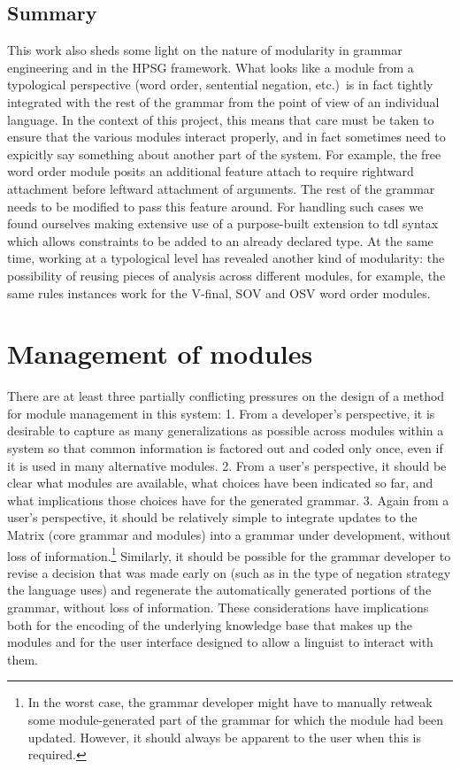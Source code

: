 \documentclass[11pt]{article}
\begin{document}
\subsection{Summary}

This work also sheds some light on the nature of modularity in grammar
engineering and in the HPSG framework.  What looks like a module from
a typological perspective (word order, sentential negation, etc.)\ is
in fact tightly integrated with the rest of the grammar from the point
of view of an individual language.  In the context of this project,
this means that care must be taken to ensure that the various modules
interact properly, and in fact sometimes need to expicitly say
something about another part of the system.  For example, the free
word order module posits an additional feature {\sc attach} to require
rightward attachment before leftward attachment of arguments.  The
rest of the grammar needs to be modified to pass this feature around.
For handling such cases we found ourselves making extensive use of a
purpose-built extension to tdl syntax which allows constraints to be
added to an already declared type.  At the same time, working at a
typological level has revealed another kind of modularity: the
possibility of reusing pieces of analysis across different modules,
for example, the same rules instances work for the V-final, SOV and
OSV word order modules.


\section{Management of modules}
\label{management}

There are at least three partially conflicting pressures on the design
of a method for module management in this system: 1. From a developer's
perspective, it is desirable to capture as many generalizations as
possible across modules within a system so that common information is
factored out and coded only once, even if it is used in many
alternative modules. 2. From a user's perspective, it should be clear
what modules are available, what choices have been indicated so far,
and what implications those choices have for the generated grammar.
3. Again from a user's perspective, it should be relatively simple to
integrate updates to the Matrix (core grammar and modules) into a
grammar under development, without loss of information.\footnote{In
the worst case, the grammar developer might have to manually retweak
some module-generated part of the grammar for which the module had
been updated.  However, it should always be apparent to the user when
this is required.}  Similarly, it should be possible for the grammar
developer to revise a decision that was made early on (such as in the
type of negation strategy the language uses) and regenerate the
automatically generated portions of the grammar, without loss of
information.  These considerations have implications both for the
encoding of the underlying knowledge base that makes up the modules
and for the user interface designed to allow a linguist to interact
with them.
\end{document}
